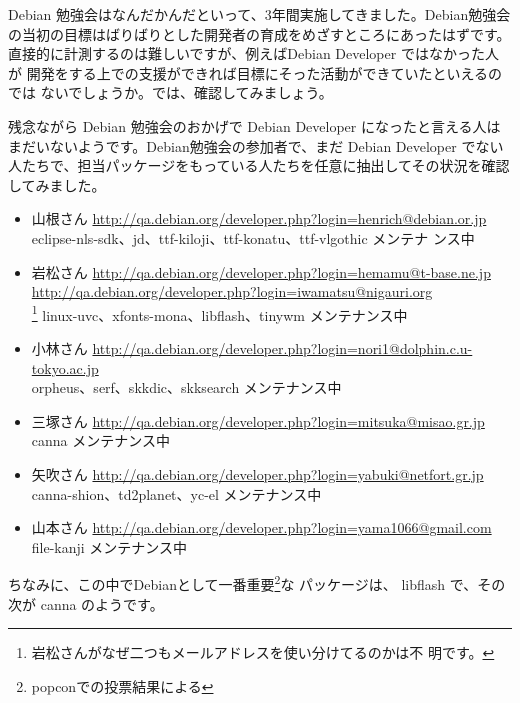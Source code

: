 \documentclass[mingoth,a4paper]{jsarticle}
\begin{document}
\clearpage 
{}
\label{sec:debmtg2007-3yearsummary}

Debian 勉強会はなんだかんだといって、3年間実施してきました。Debian勉強会
の当初の目標はばりばりとした開発者の育成をめざすところにあったはずです。
直接的に計測するのは難しいですが、例えばDebian Developer ではなかった人が
開発をする上での支援ができれば目標にそった活動ができていたといえるのでは
ないでしょうか。では、確認してみましょう。

残念ながら Debian 勉強会のおかげで Debian Developer になったと言える人は
まだいないようです。Debian勉強会の参加者で、まだ Debian Developer でない
人たちで、担当パッケージをもっている人たちを任意に抽出してその状況を確認
してみました。

\begin{itemize}
 \item
      山根さん
      \url{http://qa.debian.org/developer.php?login=henrich@debian.or.jp} \\
      eclipse-nls-sdk、jd、ttf-kiloji、ttf-konatu、ttf-vlgothic メンテナ
      ンス中
 \item
      岩松さん
      \url{http://qa.debian.org/developer.php?login=hemamu@t-base.ne.jp}
      \url{http://qa.debian.org/developer.php?login=iwamatsu@nigauri.org} \\
      \footnote{岩松さんがなぜ二つもメールアドレスを使い分けてるのかは不
      明です。}
      linux-uvc、xfonts-mona、libflash、tinywm メンテナンス中
 \item
      小林さん
      \url{http://qa.debian.org/developer.php?login=nori1@dolphin.c.u-tokyo.ac.jp} \\
      orpheus、serf、skkdic、skksearch メンテナンス中
 \item
      三塚さん
      \url{http://qa.debian.org/developer.php?login=mitsuka@misao.gr.jp} \\
      canna メンテナンス中
 \item
      矢吹さん
      \url{http://qa.debian.org/developer.php?login=yabuki@netfort.gr.jp} \\
      canna-shion、td2planet、yc-el メンテナンス中
 \item
      山本さん
      \url{http://qa.debian.org/developer.php?login=yama1066@gmail.com} \\
      file-kanji メンテナンス中
\end{itemize}

ちなみに、この中でDebianとして一番重要\footnote{popconでの投票結果による}な
パッケージは、 libflash で、その次が canna のようです。
\end{document}
